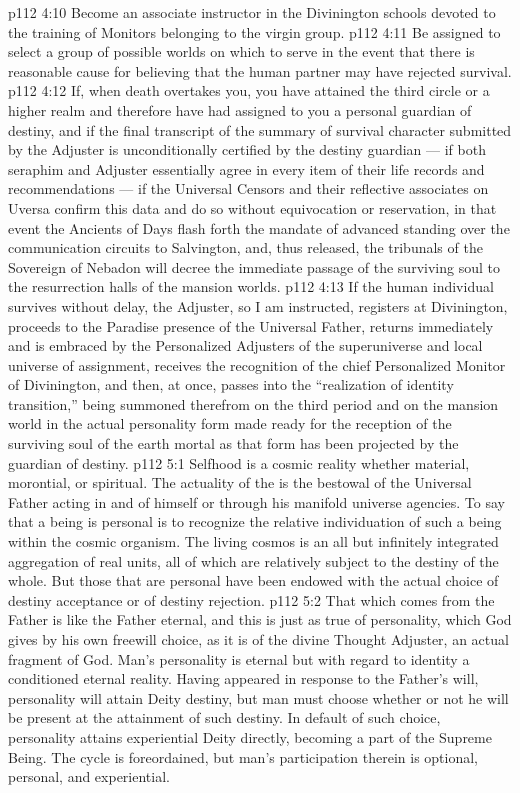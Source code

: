 \vs p112 4:10 \bibnobreakspace Become an associate instructor in the Divinington schools devoted to the training of Monitors belonging to the virgin group.
\vs p112 4:11 \bibnobreakspace Be assigned to select a group of possible worlds on which to serve in the event that there is reasonable cause for believing that the human partner may have rejected survival.
\vs p112 4:12 \pc If, when death overtakes you, you have attained the third circle or a higher realm and therefore have had assigned to you a personal guardian of destiny, and if the final transcript of the summary of survival character submitted by the Adjuster is unconditionally certified by the destiny guardian --- if both seraphim and Adjuster essentially agree in every item of their life records and recommendations --- if the Universal Censors and their reflective associates on Uversa confirm this data and do so without equivocation or reservation, in that event the Ancients of Days flash forth the mandate of advanced standing over the communication circuits to Salvington, and, thus released, the tribunals of the Sovereign of Nebadon will decree the immediate passage of the surviving soul to the resurrection halls of the mansion worlds.
\vs p112 4:13 If the human individual survives without delay, the Adjuster, so I am instructed, registers at Divinington, proceeds to the Paradise presence of the Universal Father, returns immediately and is embraced by the Personalized Adjusters of the superuniverse and local universe of assignment, receives the recognition of the chief Personalized Monitor of Divinington, and then, at once, passes into the “realization of identity transition,” being summoned therefrom on the third period and on the mansion world in the actual personality form made ready for the reception of the surviving soul of the earth mortal as that form has been projected by the guardian of destiny.
\vs p112 5:1 Selfhood is a cosmic reality whether material, morontial, or spiritual. The actuality of the  is the bestowal of the Universal Father acting in and of himself or through his manifold universe agencies. To say that a being is personal is to recognize the relative individuation of such a being within the cosmic organism. The living cosmos is an all but infinitely integrated aggregation of real units, all of which are relatively subject to the destiny of the whole. But those that are personal have been endowed with the actual choice of destiny acceptance or of destiny rejection.
\vs p112 5:2 That which comes from the Father is like the Father eternal, and this is just as true of personality, which God gives by his own freewill choice, as it is of the divine Thought Adjuster, an actual fragment of God. Man’s personality is eternal but with regard to identity a conditioned eternal reality. Having appeared in response to the Father’s will, personality will attain Deity destiny, but man must choose whether or not he will be present at the attainment of such destiny. In default of such choice, personality attains experiential Deity directly, becoming a part of the Supreme Being. The cycle is foreordained, but man’s participation therein is optional, personal, and experiential.

